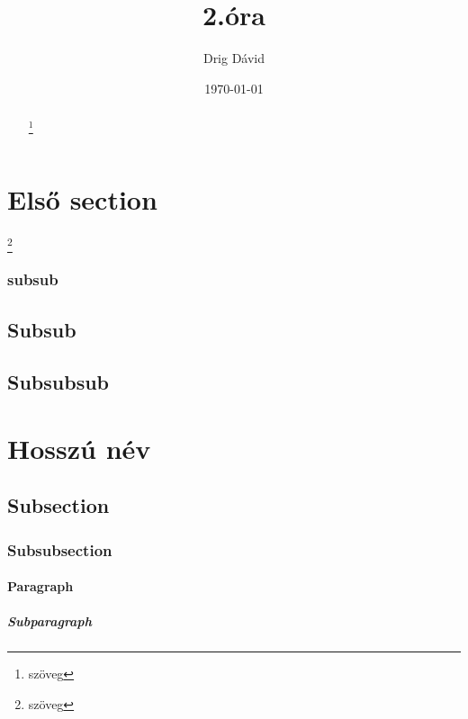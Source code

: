 \documentclass[twocolumn,twoside]{article}
\begin{document}
\pagestyle{headings}
\title{2.óra}
\author{Drig Dávid}
\date{\today}
\renewcommand{\thefootnote}{\fnsymbol{footnote}}
\maketitle



\begin{abstract}
\hulipsum[1]
\blindtext[1]
\footnote{szöveg}
\end{abstract}


\setcounter{tocdepth}{5} 
\tableofcontents
{}

\clearpage

\setcounter{secnumdepth}{5}


\section{Első section}\footnote{szöveg}
\pagestyle{myheadings}
\subsubsection{subsub}

\subsection{Subsub}
\hulipsum
\subsection{Subsubsub}

\hulipsum

\section[Rövid név]{Hosszú név}
\subsection{Subsection}
\subsubsection{Subsubsection}
\paragraph{Paragraph}
\subparagraph{Subparagraph}
\end{document}
